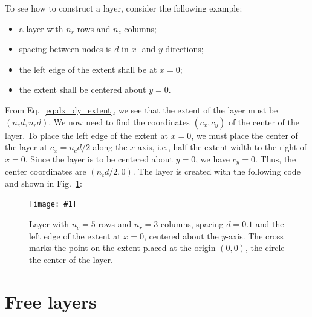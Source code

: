 \documentclass[a4paper,12pt]{report}
\newcommand{\scriptfig}[4]{%
\begin{figure}
\centerline{\texttt{[image: \#1]}}
\caption[#3]{#4}
\label{fig:#1}
\end{figure}%
}
\begin{document}
To see how to construct a layer, consider the following example:
\begin{itemize}
\item a layer with $n_r$ rows and $n_c$ columns;
\item spacing between nodes is $d$ in $x$- and $y$-directions;
\item the left edge of the extent shall be at $x=0$;
\item the extent shall be centered about $y=0$.
\end{itemize}
From Eq.~\ref{eq:dx_dy_extent}, we see that the extent of the layer
must be $(n_c d, n_r d)$. We now need to find the coordinates $(c_x,
c_y)$ of the center of the layer. To place the left edge of the extent
at $x=0$, we must place the center of the layer at $c_x=n_c d / 2$
along the $x$-axis, i.e., half the extent width to the right of
$x=0$. Since the layer is to be centered about $y=0$, we have
$c_y=0$. Thus, the center coordinates are $(n_c d/2, 0)$. The layer is
created with the following code and shown in Fig.~\ref{fig:layer3a}:
%

\scriptfig{layer3a}{0.5}{Layer construction example}%
{Layer with $n_c=5$ rows and $n_r=3$ columns, spacing $d=0.1$ and the
  left edge of the extent at $x=0$, centered about the $y$-axis. The
  cross marks the point on the extent placed at the origin $(0,0)$,
the circle the center of the layer.}
%


\section{Free layers}\label{sec:freelayer}
\end{document}
